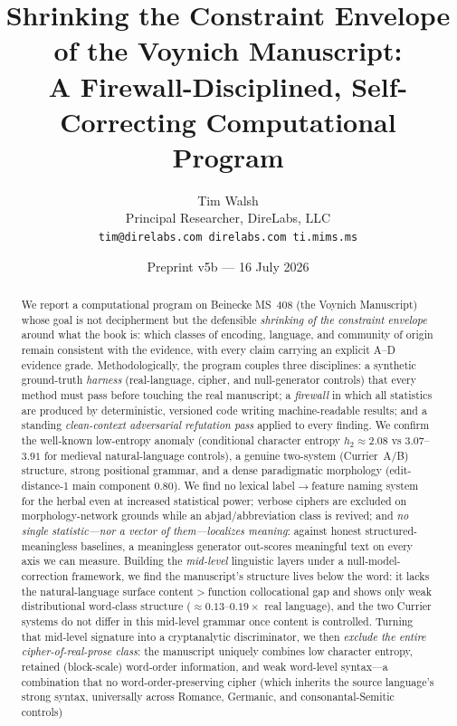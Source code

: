 \documentclass[11pt]{article}
\title{\textbf{Shrinking the Constraint Envelope of the Voynich Manuscript:\\
A Firewall-Disciplined, Self-Correcting Computational Program}}
\author{Tim Walsh \\ \small Principal Researcher, DireLabs, LLC \\
\small \texttt{tim@direlabs.com \quad direlabs.com \quad ti.mims.ms}}
\date{Preprint v5b --- 16 July 2026}
\begin{document}
\maketitle

\begin{abstract}
\noindent We report a computational program on Beinecke MS~408 (the Voynich
Manuscript) whose goal is not decipherment but the defensible \emph{shrinking of the
constraint envelope} around what the book is: which classes of encoding, language,
and community of origin remain consistent with the evidence, with every claim carrying
an explicit A--D evidence grade. Methodologically, the program couples three
disciplines: a synthetic ground-truth \emph{harness} (real-language, cipher, and
null-generator controls) that every method must pass before touching the real
manuscript; a \emph{firewall} in which all statistics are produced by deterministic,
versioned code writing machine-readable results; and a standing \emph{clean-context
adversarial refutation pass} applied to every finding. We confirm the well-known
low-entropy anomaly (conditional character entropy $h_2\approx 2.08$ vs
$3.07$--$3.91$ for medieval natural-language controls), a genuine two-system
(Currier~A/B) structure, strong positional grammar, and a dense paradigmatic
morphology (edit-distance-1 main component $0.80$). We find no lexical
label$\rightarrow$feature naming system for the herbal even at increased statistical
power; verbose ciphers are excluded on morphology-network grounds while an
abjad/abbreviation class is revived; and \emph{no single statistic---nor a vector of
them---localizes meaning}: against honest structured-meaningless baselines, a
meaningless generator out-scores meaningful text on every axis we can measure. Building
the \emph{mid-level} linguistic layers under a null-model-correction framework, we find
the manuscript's structure lives below the word: it lacks the natural-language surface
content$>$function collocational gap and shows only weak distributional word-class
structure ($\approx\!0.13$--$0.19\times$ real language), and the two Currier systems do
not differ in this mid-level grammar once content is controlled. Turning that mid-level
signature into a cryptanalytic discriminator, we then \emph{exclude the entire
cipher-of-real-prose class}: the manuscript uniquely combines low character entropy,
retained (block-scale) word-order information, and weak word-level syntax---a
combination that no word-order-preserving cipher (which inherits the source language's
strong syntax, universally across Romance, Germanic, and consonantal-Semitic controls)

\end{abstract}
\end{document}
